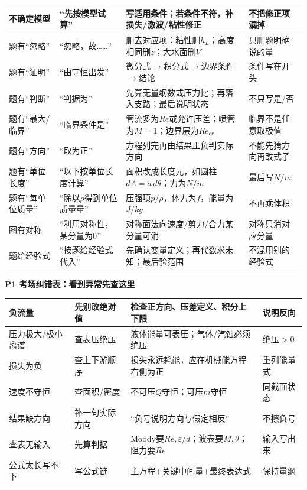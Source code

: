 \documentclass[UTF8,a4paper]{ctexart}
\newcommand{\ftitle}[1]{\vspace{1pt}\textbf{\textcolor{B}{#1}}\par\vspace{0.5pt}}
\begin{document}
\begin{tabular}{|L{0.19\textwidth}|L{0.23\textwidth}|L{0.34\textwidth}|L{0.19\textwidth}|}\hline
不确定模型 & “先按\underline{\hspace{0.4cm}}模型试算” & 写适用条件；若条件不符，补损失/激波/粘性修正 & 不把修正项漏掉 \\\hline
题有“忽略” & “忽略\underline{\hspace{0.4cm}}，故……” & 删去对应项：粘性删$h_L$；高度相同删$z$；大水面删$V$ & 只删题明确说的量 \\\hline
题有“证明” & “由\underline{\hspace{0.5cm}}守恒出发” & 微分式$\to$积分式$\to$边界条件$\to$结论 & 条件写在开头 \\\hline
题有“判断” & “判据为\underline{\hspace{0.5cm}}” & 先算无量纲数或压力比；再落入支路；最后说明状态 & 不只写是/否 \\\hline
题有“最大/临界” & “临界条件是\underline{\hspace{0.5cm}}” & 管流多为$Re$或允许压差；喷管为$M=1$；边界层为$Re_{cr}$ & 临界不是任意取极值 \\\hline
题有“方向” & “取\underline{\hspace{0.4cm}}为正” & 方程列完再由结果正负判实际方向 & 不能先猜方向再改式子 \\\hline
题有“单位长度” & “以下按单位长度计算” & 面积改成长度元，如圆柱$dA=a\,d\theta$；力为$N/m$ & 最后写$N/m$ \\\hline
题有“每单位质量” & “除以$\rho$得到单位质量量” & 压强项$p/\rho$，体力为$f$，能量为$J/kg$ & 不再乘体积 \\\hline
图有对称 & “利用对称性，某分量为0” & 对称面法向速度/剪力/合力某分量可消 & 对称只消对应分量 \\\hline
题给经验式 & “按题给经验式代入” & 先确认变量定义；再代数求未知；最后验范围 & 不混用别的经验式 \\\hline
\end{tabular}
\ftitle{P1 考场纠错表：看到异常先查这里}
\begin{tabular}{|L{0.22\textwidth}|L{0.25\textwidth}|L{0.33\textwidth}|L{0.15\textwidth}|}\hline
负流量 & 先别改绝对值 & 检查正方向、压差定义、积分上下限 & 说明反向 \\\hline
压力极大/极小离谱 & 查表压绝压 & 液体能量可表压；气体/汽蚀必须绝压 & 绝压$>0$ \\\hline
损失为负 & 查上下游顺序 & 损失永远耗能，应在机械能方程右侧为正 & 重列能量式 \\\hline
速度不守恒 & 查面积/密度 & 不可压$Q$守恒；可压$\dot m$守恒 & 同截面状态 \\\hline
结果缺方向 & 补一句实际方向 & “负号说明方向与假定相反” & 不擦负号 \\\hline
查表无输入 & 先算判据 & Moody要$Re,\varepsilon/d$；波表要$M,\theta$；阻力要$Re$ & 输入写出来 \\\hline
公式太长写不下 & 写公式链 & 主方程+关键中间量+最终表达式 & 保持量纲 \\\hline
\end{tabular}
\end{document}
